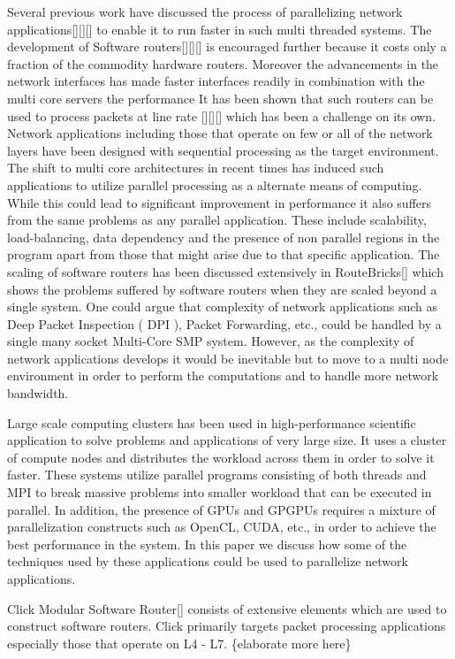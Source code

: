 \documentclass[conference]{IEEEtran}
\begin{document}
Several previous work have discussed the process of parallelizing network applications[][][] to enable it to run faster in such multi threaded systems. The development of Software routers[][][] is encouraged further because it costs only a fraction of the commodity hardware routers. Moreover the advancements in the network interfaces has made faster interfaces readily in combination with the multi core servers the performance  It has been shown that such routers can be used to process packets at line rate [][][] which has been a challenge on its own. Network applications including those that operate on few or all of the network layers have been designed with sequential processing as the target environment. The shift to multi core architectures in recent times has induced such applications to utilize parallel processing as a alternate means of computing. While this could lead to significant improvement in performance it also suffers from the same problems as any parallel application. These include scalability, load-balancing, data dependency and the presence of non parallel regions in the program apart from those that might arise due to that specific application. The scaling of software routers has been discussed extensively in RouteBricks[] which shows the problems suffered by software routers when they are scaled beyond a single system. One could argue that complexity of network applications such as Deep Packet Inspection ( DPI ), Packet Forwarding, etc., could be handled by a single many socket Multi-Core SMP system. However, as the complexity of network applications develops it would be inevitable but to move to a multi node environment in order to perform the computations and to handle more network bandwidth.

Large scale computing clusters has been used in high-performance scientific application to solve problems and applications of very large size. It uses a cluster of compute nodes and distributes the workload across them in order to solve it faster. These systems utilize parallel programs consisting of both threads and MPI to break massive problems into smaller workload that can be executed in parallel. In addition, the presence of GPUs and GPGPUs requires a mixture of parallelization constructs such as OpenCL, CUDA, etc., in order to achieve the best performance in the system. In this paper we discuss how some of the techniques used by these applications could be used to parallelize network applications.

Click Modular Software Router[] consists of extensive elements which are used to construct software routers. Click primarily targets packet processing applications especially those that operate on L4 - L7. \{elaborate more here\}
\end{document}
